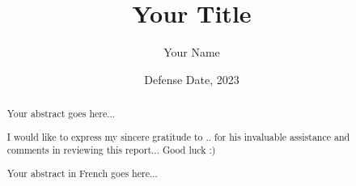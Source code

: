 \documentclass[12pt, a4paper]{memoir} %
\title{Your Title} %
\author{Your Name}
\date{Defense Date, 2023} %
\begin{document}
\frontmatter
\begin{titlingpage}
\maketitle
\end{titlingpage}

\setlength{\parskip}{-1pt plus 1pt}

\renewcommand{\abstracttextfont}{\normalfont}
\abstractintoc
\begin{abstract} 
Your abstract goes here... 
\end{abstract}
\abstractintoc

\renewcommand\abstractname{Acknowledgement}
\begin{abstract}
I would like to express my sincere gratitude to .. for his invaluable assistance and comments in reviewing this report... 
Good luck :) 
\end{abstract}


\renewcommand\abstractname{R\'esum\'e}
\begin{abstract} 
Your abstract in French goes here... 
\end{abstract}

\cleardoublepage

\tableofcontents* %
\normalsize

\mainmatter
\SingleSpace






\backmatter



\end{document}
